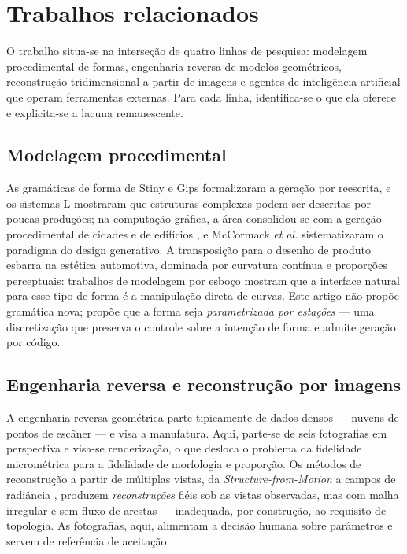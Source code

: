 \section{Trabalhos relacionados}
\label{sec:relacionados}

O trabalho situa-se na interse\c{c}\~ao de quatro linhas de pesquisa: modelagem
procedimental de formas, engenharia reversa de modelos geom\'etricos, reconstru\c{c}\~ao
tridimensional a partir de imagens e agentes de intelig\^encia artificial que operam
ferramentas externas. Para cada linha, identifica-se o que ela oferece e explicita-se a
lacuna remanescente.

\subsection{Modelagem procedimental}

As gram\'aticas de forma de Stiny e Gips \cite{stiny1972} formalizaram a
gera\c{c}\~ao por reescrita, e os sistemas-L \cite{prusinkiewicz1990} mostraram que
estruturas complexas podem ser descritas por poucas produ\c{c}\~oes; na
computa\c{c}\~ao gr\'afica, a \'area consolidou-se com a gera\c{c}\~ao procedimental de
cidades \cite{parish2001} e de edif\'icios \cite{muller2006}, e McCormack \emph{et al.}
\cite{mccormack2004} sistematizaram o paradigma do design generativo. A
transposi\c{c}\~ao para o desenho de produto esbarra na est\'etica automotiva, dominada
por curvatura cont\'inua e propor\c{c}\~oes perceptuais: trabalhos de modelagem por
esbo\c{c}o \cite{igarashi1999} mostram que a interface natural para esse tipo de forma
\'e a manipula\c{c}\~ao direta de curvas. Este artigo n\~ao prop\~oe gram\'atica nova;
prop\~oe que a forma seja \emph{parametrizada por esta\c{c}\~oes} --- uma
discretiza\c{c}\~ao que preserva o controle sobre a inten\c{c}\~ao de forma e admite
gera\c{c}\~ao por c\'odigo.

\subsection{Engenharia reversa e reconstru\c{c}\~ao por imagens}

A engenharia reversa geom\'etrica \cite{varady1997, otto2001} parte tipicamente de dados
densos --- nuvens de pontos de esc\^aner --- e visa a manufatura. Aqui, parte-se de seis
fotografias em perspectiva e visa-se renderiza\c{c}\~ao, o que desloca o problema da
fidelidade microm\'etrica para a fidelidade de morfologia e propor\c{c}\~ao. Os m\'etodos
de reconstru\c{c}\~ao a partir de m\'ultiplas vistas, da \emph{Structure-from-Motion}
\cite{snavely2006, schonberger2016} a campos de radi\^ancia \cite{mildenhall2020},
produzem \emph{reconstru\c{c}\~oes} fi\'eis sob as vistas observadas, mas com malha
irregular e sem fluxo de arestas --- inadequada, por constru\c{c}\~ao, ao requisito de
topologia. As fotografias, aqui, alimentam a decis\~ao humana sobre par\^ametros e servem
de refer\^encia de aceita\c{c}\~ao.

